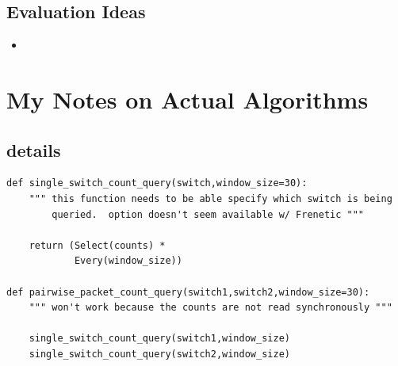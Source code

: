 \subsection{Evaluation Ideas}

\begin{itemize}

	\item {}
	
\end{itemize}


















\section{My Notes on Actual Algorithms}

\subsection{\fl details}

\begin{framed}
\begin{verbatim}
def single_switch_count_query(switch,window_size=30):
    """ this function needs to be able specify which switch is being 
        queried.  option doesn't seem available w/ Frenetic """

    return (Select(counts) * 
            Every(window_size))

def pairwise_packet_count_query(switch1,switch2,window_size=30):
    """ won't work because the counts are not read synchronously """

    single_switch_count_query(switch1,window_size)  
    single_switch_count_query(switch2,window_size)
\end{verbatim}
\end{framed}

